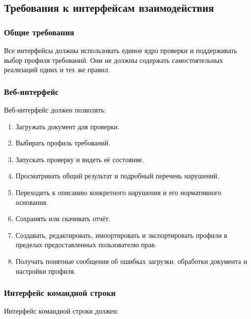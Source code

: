 \documentclass[a4paper,14pt]{extarticle}
\begin{document}
\subsection{Требования к интерфейсам взаимодействия}

\subsubsection{Общие требования}

Все интерфейсы должны использовать единое ядро проверки и поддерживать выбор профиля требований. Они не должны содержать самостоятельных реализаций одних и тех же правил.

\subsubsection{Веб-интерфейс}

Веб-интерфейс должен позволять:

\begin{enumerate}
    \item Загружать документ для проверки.
    \item Выбирать профиль требований.
    \item Запускать проверку и видеть её состояние.
    \item Просматривать общий результат и подробный перечень нарушений.
    \item Переходить к описанию конкретного нарушения и его нормативного основания.
    \item Сохранять или скачивать отчёт.
    \item Создавать, редактировать, импортировать и экспортировать профили в пределах предоставленных пользователю прав.
    \item Получать понятные сообщения об ошибках загрузки, обработки документа и настройки профиля.
\end{enumerate}

\subsubsection{Интерфейс командной строки}

Интерфейс командной строки должен:
\end{document}
